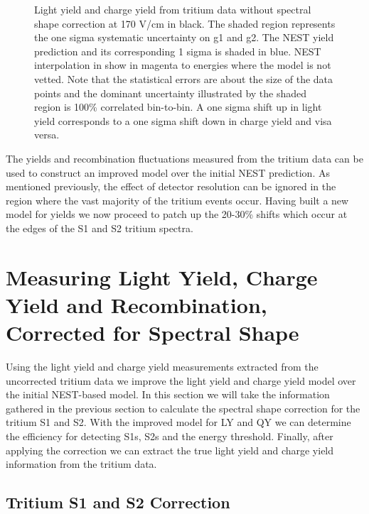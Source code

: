 \begin{figure}[h!]
\caption{Light yield and charge yield from tritium data without spectral shape correction at 170 V/cm in black. The shaded region represents the one sigma systematic uncertainty on g1 and g2. The NEST yield prediction and its corresponding 1 sigma is shaded in blue. NEST interpolation in show in magenta to energies where the model is not vetted. Note that the statistical errors are about the size of the data points and the dominant uncertainty illustrated by the shaded region is 100\% correlated bin-to-bin. A one sigma shift up in light yield corresponds to a one sigma shift down in charge yield and visa versa.}
\label{fig:LYQY_iter0}
\end{figure}
\renewcommand{\baselinestretch}{2}
\small\normalsize

The yields and recombination fluctuations measured from the tritium data can be used to construct an improved model over the initial NEST prediction. As mentioned previously, the effect of detector resolution can be ignored in the region where the vast majority of the tritium events occur. Having built a new model for yields we now proceed to patch up the 20-30\% shifts which occur at the edges of the S1 and S2 tritium spectra.



\section{Measuring Light Yield, Charge Yield and Recombination, Corrected for Spectral Shape}

Using the light yield and charge yield measurements extracted from the uncorrected tritium data we improve the light yield and charge yield model over the initial NEST-based model. In this section we will take the information gathered in the previous section to calculate the spectral shape correction for the tritium S1 and S2. With the improved model for LY and QY we can determine the efficiency for detecting S1s, S2s and the energy threshold. Finally, after applying the correction we can extract the true light yield and charge yield information from the tritium data.

\subsection{Tritium S1 and S2 Correction}

